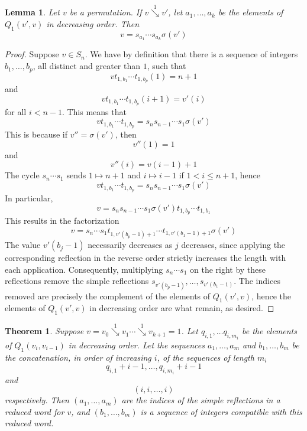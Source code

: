 \documentclass{amsart}
\newtheorem{lemma}{Lemma}[subsection]
\newtheorem{theorem}{Theorem}[section]
\theoremstyle{definition}
\theoremstyle{remark}
\numberwithin{equation}{subsection}
\newcommand{\downvar}[1]{\stackrel{#1}{\searrow}}
\begin{document}
\begin{lemma}\label{lemma:factor}
Let $v$ be a permutation. If $v\downvar{1} v'$, let $a_1,\ldots, a_k$ be the elements of $Q_1(v',v)$ in decreasing order. Then
$$v=s_{a_1}\cdots s_{a_k}\sigma(v')$$
\end{lemma}
\begin{proof}
	Suppose $v\in S_{n}$. We have by definition that there is a sequence of integers $b_1,\ldots,b_p$, all distinct and greater than $1$, such that
	$$vt_{1,b_1}\cdots t_{1, b_p}(1) = n + 1$$
	and
	$$vt_{1,b_1}\cdots t_{1, b_p}(i+1) = v'(i)$$
	for all $i<n-1$. This means that
	$$vt_{1,b_1}\cdots t_{1, b_p} = s_ns_{n-1}\cdots s_1\sigma(v')$$
	This is because if $v''=\sigma(v')$, then
	$$v''(1)=1$$
	and
	$$v''(i) = v(i-1)+1$$
	The cycle $s_n\cdots s_1$ sends $1\mapsto n+1$ and $i\mapsto i-1$ if $1<i\leq n+1$, hence
	$$vt_{1,b_1}\cdots t_{1, b_p} = s_ns_{n-1}\cdots s_1\sigma(v')$$
	In particular,
	$$v = s_ns_{n-1}\cdots s_1\sigma(v')t_{1,b_p}\cdots t_{1, b_1}$$
	This results in the factorization
	$$v = s_n\cdots s_1t_{1,v'(b_p-1)+1}\cdots t_{1,v'(b_1-1)+1}\sigma(v')$$
	The value $v'(b_j-1)$ necessarily decreases as $j$ decreases, since applying the corresponding reflection in the reverse order strictly increases the length with each application.  Consequently, multiplying $s_n\cdots s_1$ on the right by these reflections remove the simple reflections $s_{v'(b_p-1)},\ldots, s_{v'(b_1-1)}$. The indices removed are precisely the complement of the elements of $Q_1(v',v)$, hence the elements of $Q_1(v',v)$ in decreasing order are what remain, as desired.
\end{proof}

\begin{theorem} \label{theorem:sequencecompat}
	Suppose $v=v_0\downvar{1} v_1\cdots \downvar{1} v_{k+1}=1$. Let $q_{i,1},\ldots q_{i,m_i}$ be the elements of $Q_1(v_i,v_{i-1})$ in decreasing order. Let the sequences $a_1,\ldots,a_m$ and $b_1,\ldots,b_m$ be the concatenation, in order of increasing $i$, of the sequences of length $m_i$
	$$q_{i,1} + i -1,\ldots, q_{i,m_i} + i - 1$$
	and
	$$(i, i,\ldots, i)$$
	respectively. Then $(a_1,\ldots,a_m)$ are the indices of the simple reflections in a reduced word for $v$, and $(b_1,\ldots,b_m)$ is a sequence of integers compatible with this reduced word.
\end{theorem}

\end{document}
